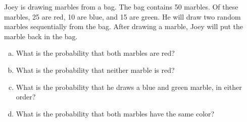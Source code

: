 \documentclass[11pt,letterpaper]{article}
\begin{document}

 Joey is drawing marbles from a bag. The bag contains 50 marbles. Of these marbles, 25 are red, 10 are blue, and 15 are green. He will draw two random marbles sequentially from the bag. After drawing a marble, Joey will put the marble back in the bag.
	\begin{enumerate}[(a)]
	\item What is the probability that both marbles are red?
	\item What is the probability that neither marble is red?
	\item What is the probability that he draws a blue and green marble, in either order?
	\item What is the probability that both marbles have the same color?
	\end{enumerate} \pspace
\end{document}
